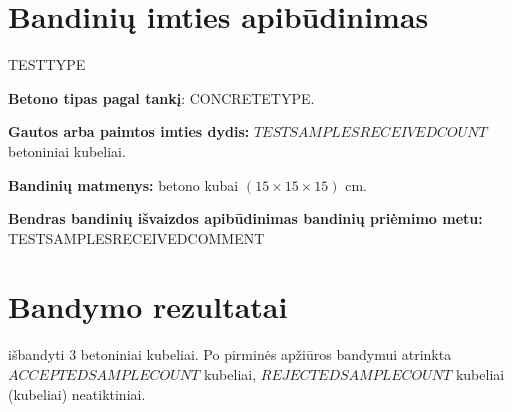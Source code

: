 \documentclass[a4paper, 12pt]{article}
\begin{document}
\section{Bandinių imties apibūdinimas}

\hspace{\parindent}{\bf Bandymo tipas pagal LST EN 206-1 8.2.1.2 ir/arba 8.2.1.3 pastraipas:} {{{TESTTYPE}} }

{\bf Betono tipas pagal tankį}: {{{CONCRETETYPE}}}.%

{\bf Gautos arba paimtos imties dydis:} $ {{TESTSAMPLESRECEIVEDCOUNT}} $ betoniniai kubeliai. 
	
	{\bf Bandinių matmenys:} betono kubai { $ (15 \times 15 \times 15) $} cm.
	
	{\bf Bendras bandinių išvaizdos apibūdinimas bandinių priėmimo metu:} {{TESTSAMPLESRECEIVEDCOMMENT}} %


\section{Bandymo rezultatai}

\hspace{\parindent}{\bf Imties dydis:} išbandyti $ 3 $ betoniniai kubeliai.
Po pirminės apžiūros bandymui atrinkta $ {{ACCEPTEDSAMPLECOUNT}} $ kubeliai,
$ {{REJECTEDSAMPLECOUNT}} $ kubeliai (kubeliai) neatiktiniai. %
\end{document}

